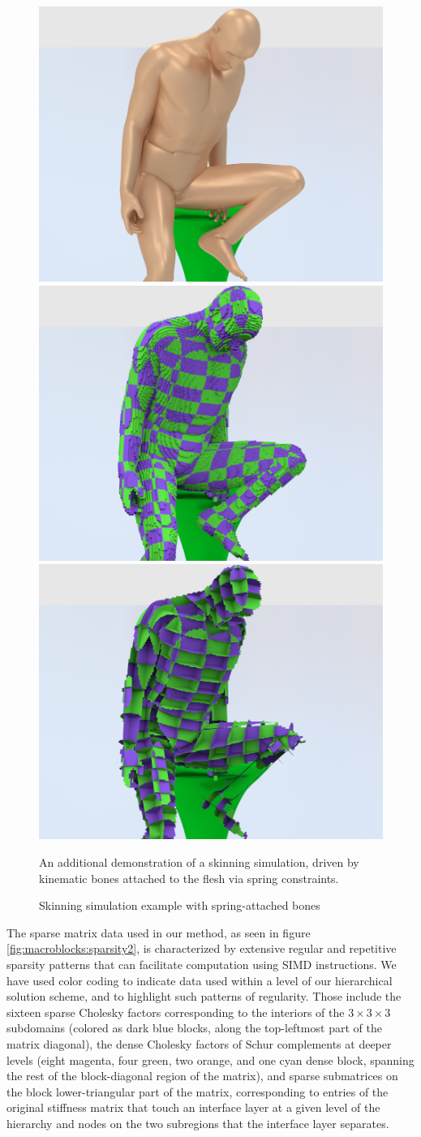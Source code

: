 \begin{figure}[t!] \begin{center} \includegraphics[width=.31\textwidth]{chapter_macroblocks/images/skinning2_skin.png} \includegraphics[width=.31\textwidth]{chapter_macroblocks/images/skinning2_macroblocks.png} \includegraphics[width=.31\textwidth]
    {chapter_macroblocks/images/skinning2_interface.png} \end{center}
  \vspace{-.05in} \caption{Skinning simulation example with
    spring-attached bones}{An additional demonstration of a skinning
    simulation, driven by kinematic bones attached to the flesh via
    spring constraints.}
  \vspace{-.25in} \label{fig:macroblocks:skinning2-example} \end{figure}

The sparse matrix data used in our method, as seen in figure
\ref{fig:macroblocks:sparsity2}, is characterized by extensive regular and
repetitive sparsity patterns that can facilitate computation using
SIMD instructions. We have used color coding to indicate data used
within a level of our hierarchical solution scheme, and to highlight
such patterns of regularity. Those include the sixteen sparse Cholesky
factors corresponding to the interiors of the $3\times 3\times 3$
subdomains (colored as dark blue blocks, along the top-leftmost part
of the matrix diagonal), the dense Cholesky factors of Schur
complements at deeper levels (eight magenta, four green, two orange,
and one cyan dense block, spanning the rest of the block-diagonal
region of the matrix), and sparse submatrices on the block
lower-triangular part of the matrix, corresponding to entries of the
original stiffness matrix that touch an interface layer at a given
level of the hierarchy and nodes on the two subregions that the
interface layer separates.

